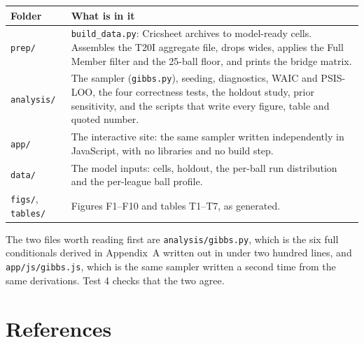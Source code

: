 \documentclass[11pt,a4paper]{article}
\begin{document}
\begin{center}\small
\begin{tabular}{>{\raggedright\arraybackslash}p{4.2cm}>{\raggedright\arraybackslash}p{10.4cm}}
\toprule
Folder & What is in it \\
\midrule
\texttt{prep/} & \texttt{build\_data.py}: Cricsheet archives to model-ready cells. Assembles the
  T20I aggregate file, drops wides, applies the Full Member filter and the 25-ball floor, and
  prints the bridge matrix. \\
\texttt{analysis/} & The sampler (\texttt{gibbs.py}), seeding, diagnostics, WAIC and PSIS-LOO,
  the four correctness tests, the holdout study, prior sensitivity, and the scripts that write
  every figure, table and quoted number. \\
\texttt{app/} & The interactive site: the same sampler written independently in JavaScript, with
  no libraries and no build step. \\
\texttt{data/} & The model inputs: cells, holdout, the per-ball run distribution and the
  per-league ball profile. \\
\texttt{figs/}, \texttt{tables/} & Figures F1--F10 and tables T1--T7, as generated. \\
\bottomrule
\end{tabular}
\end{center}

The two files worth reading first are \texttt{analysis/gibbs.py}, which is the six full
conditionals derived in Appendix~A written out in under two hundred lines, and
\texttt{app/js/gibbs.js}, which is the same sampler written a second time from the same
derivations. Test 4 checks that the two agree.

\section*{References}
\end{document}
